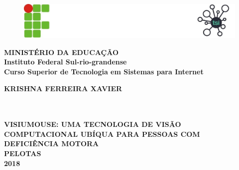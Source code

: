 \thispagestyle{empty}

\vfill
 \begin{center}

		\begin{figure}[t]
			\centering
			\includegraphics{figures/logo-ifsul-pelotas-tsi.jpg}	
		\end{figure}

\begin{spacing}{1.5}
{\large\bfseries 
MINISTÉRIO DA EDUCAÇÃO \\
Instituto Federal Sul-rio-grandense \\
Curso Superior de Tecnologia em Sistemas para Internet 
} 
\\
 
 \end{spacing}

    \vspace*{1in}
    \begin{large} \bfseries KRISHNA FERREIRA XAVIER\end{large}\\[0.4in]

    \vspace*{4cm}
    \noindent \\
    \large\bfseries{VISIUMOUSE: UMA TECNOLOGIA DE VISÃO COMPUTACIONAL UBÍQUA PARA PESSOAS COM DEFICIÊNCIA MOTORA} \\
    \vfill
    \large\bfseries{PELOTAS \\ 2018}
\end{center}

\normalsize

